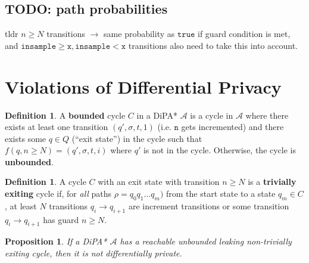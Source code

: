 \documentclass[12pt]{article}
\newcommand{\gguard}{\texttt{insample} \geq \texttt{x}}
\newcommand{\lguard}{\texttt{insample} < \texttt{x}}
\newtheorem{prop}[thm]{Proposition}
\theoremstyle{definition}
\newtheorem{defn}[thm]{Definition}
\begin{document}
\subsection{TODO: path probabilities}

tldr $n\geq N$ transitions $\to$ same probability as $\texttt{true}$ if guard condition is met, and $\gguard, \lguard$ transitions also need to take this into account.

\section{Violations of Differential Privacy}

\begin{defn}
A \textbf{bounded} cycle $C$ in a DiPA* $\mathcal{A}$ is a cycle in $\mathcal{A}$ where there exists at least one transition $(q', \sigma, t, 1)$ (i.e. $\texttt{n}$ gets incremented) and there exists some $q\in Q$ (``exit state'') in the cycle such that $f(q, n \geq N) = (q', \sigma, t, i)$ where $q'$ is not in the cycle. Otherwise, the cycle is \textbf{unbounded}. 
\end{defn}

\begin{defn}
A cycle $C$ with an exit state with transition $n\geq N$ is a \textbf{trivially exiting} cycle if, for \textit{all} paths $\rho = q_0q_1...q_m)$ from the start state to a state $q_m \in C$, at least $N$ transitions $q_i \to q_{i+1}$ are increment transitions or some transition $q_i \to q_{i+1}$ has guard $n\geq N$.
\end{defn}


\begin{prop} If a DiPA* $\mathcal{A}$ has a reachable unbounded leaking non-trivially exiting cycle, then it is not differentially private.
\end{prop}
\end{document}
